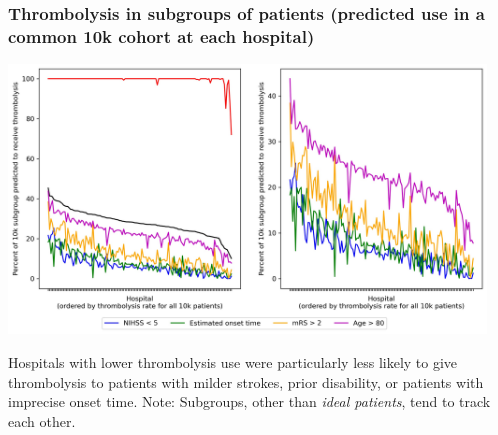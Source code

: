 \begin{frame}
\frametitle{Thrombolysis in subgroups of patients (predicted use in a common 10k cohort at each hospital)}

    \begin{center}
    \includegraphics[width=0.95\textwidth]{./images/15_xgb_10_features_10k_cohort}
    \end{center}

\footnotesize Hospitals with lower thrombolysis use were particularly less likely to give thrombolysis to patients with milder strokes, prior disability, or patients with imprecise onset time.
\newline
\newline
\footnotesize Note: Subgroups, other than \emph{ideal patients}, tend to track each other.  

\end{frame}